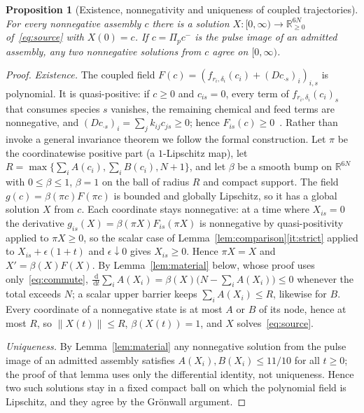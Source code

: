 \documentclass[11pt,a4paper]{article}
\theoremstyle{plain}
\newtheorem{proposition}[theorem]{Proposition}
\theoremstyle{definition}
\theoremstyle{remark}
\newcommand{\R}{\mathbb R}
\newcommand{\dd}{\,\mathrm d}
\newcommand{\Pulse}{\Pi}
\newcommand{\Dop}{D}
\begin{document}
\begin{proposition}[Existence, nonnegativity and uniqueness of coupled trajectories]\label{prop:existence}
For every nonnegative assembly $c$ there is a solution $X:[0,\infty)\to\R^{6N}_{\ge0}$ of~\eqref{eq:source} with $X(0)=c$. If $c=\Pulse_pc^-$ is the pulse image of an admitted assembly, any two nonnegative solutions from $c$ agree on $[0,\infty)$.
\end{proposition}
\begin{proof}
\emph{Existence.} The coupled field $F(c)=(f_{r_i,\delta_i}(c_i)+(\Dop c_{\cdot s})_i)_{i,s}$ is polynomial. It is quasi-positive: if $c\ge0$ and $c_{is}=0$, every term of $f_{r_i,\delta_i}(c_i)_s$ that consumes species $s$ vanishes, the remaining chemical and feed terms are nonnegative, and $(\Dop c_{\cdot s})_i=\sum_jk_{ij}c_{js}\ge0$; hence $F_{is}(c)\ge0$~\citep{feinberg2019,pierre2010}. Rather than invoke a general invariance theorem we follow the formal construction. Let $\pi$ be the coordinatewise positive part (a $1$-Lipschitz map), let $R=\max\{\sum_iA(c_i),\sum_iB(c_i),N+1\}$, and let $\beta$ be a smooth bump on $\R^{6N}$ with $0\le\beta\le1$, $\beta=1$ on the ball of radius $R$ and compact support. The field $g(c)=\beta(\pi c)F(\pi c)$ is bounded and globally Lipschitz, so it has a global solution $X$ from $c$. Each coordinate stays nonnegative: at a time where $X_{is}=0$ the derivative $g_{is}(X)=\beta(\pi X)F_{is}(\pi X)$ is nonnegative by quasi-positivity applied to $\pi X\ge0$, so the scalar case of Lemma~\ref{lem:comparison}\ref{it:strict} applied to $X_{is}+\epsilon(1+t)$ and $\epsilon\downarrow0$ gives $X_{is}\ge0$. Hence $\pi X=X$ and $X'=\beta(X)F(X)$. By Lemma~\ref{lem:material} below, whose proof uses only~\eqref{eq:commute}, $\frac{\dd}{\dd t}\sum_iA(X_i)=\beta(X)\bigl(N-\sum_iA(X_i)\bigr)\le0$ whenever the total exceeds $N$; a scalar upper barrier keeps $\sum_iA(X_i)\le R$, likewise for $B$. Every coordinate of a nonnegative state is at most $A$ or $B$ of its node, hence at most $R$, so $\|X(t)\|\le R$, $\beta(X(t))=1$, and $X$ solves~\eqref{eq:source}.

\emph{Uniqueness.} By Lemma~\ref{lem:material} any nonnegative solution from the pulse image of an admitted assembly satisfies $A(X_i),B(X_i)\le11/10$ for all $t\ge0$; the proof of that lemma uses only the differential identity, not uniqueness. Hence two such solutions stay in a fixed compact ball on which the polynomial field is Lipschitz, and they agree by the Gr\"onwall argument.
\end{proof}
\end{document}

